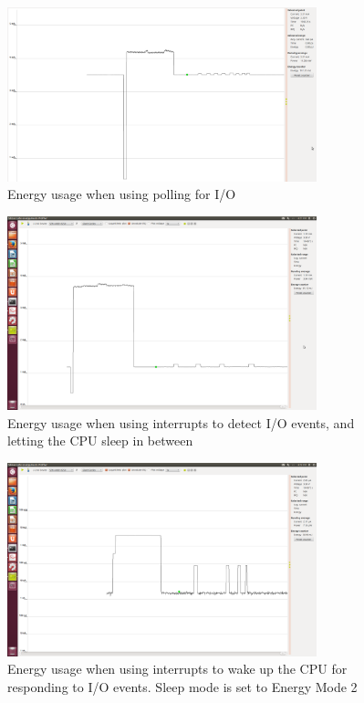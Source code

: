 \begin{figure}[ht!]
    \begin{center}
    \includegraphics[width=0.8\textwidth]{assets/img/polling.png}
    \caption{Energy usage when using polling for I/O}
    \label{fig:polling_io}
    \end{center}
\end{figure}

\begin{figure}[ht!]
    \begin{center}
    \includegraphics[width=0.8\textwidth]{assets/img/interrupt_regular_sleep.png}
    \caption{Energy usage when using interrupts to detect I/O events, and letting the CPU sleep in between}
    \label{fig:interrupt_io}
    \end{center}
\end{figure}

\begin{figure}[ht!]
    \begin{center}
    \includegraphics[width=0.8\textwidth]{assets/img/interrupt_deep_sleep.png}
    \caption{Energy usage when using interrupts to wake up the CPU for responding to I/O events. Sleep mode is set to Energy Mode 2}
    \label{fig:interrupt_io_deep_sleep}
    \end{center}
\end{figure}
